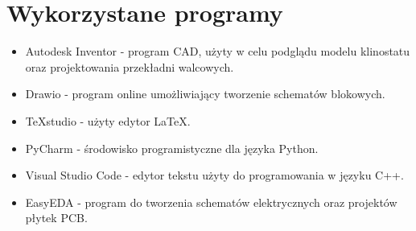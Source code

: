 \chapter*{Wykorzystane programy}

\begin{itemize}
	\item Autodesk Inventor - program CAD, użyty w celu podglądu modelu klinostatu oraz projektowania przekładni walcowych.
	\item Drawio - program online umożliwiający tworzenie schematów blokowych.
	\item TeXstudio - użyty edytor LaTeX.
	\item PyCharm - środowisko programistyczne dla języka Python.
	\item Visual Studio Code - edytor tekstu użyty do programowania w języku C++.
	\item EasyEDA - program do tworzenia schematów elektrycznych oraz projektów płytek PCB.
\end{itemize}\textbf{}